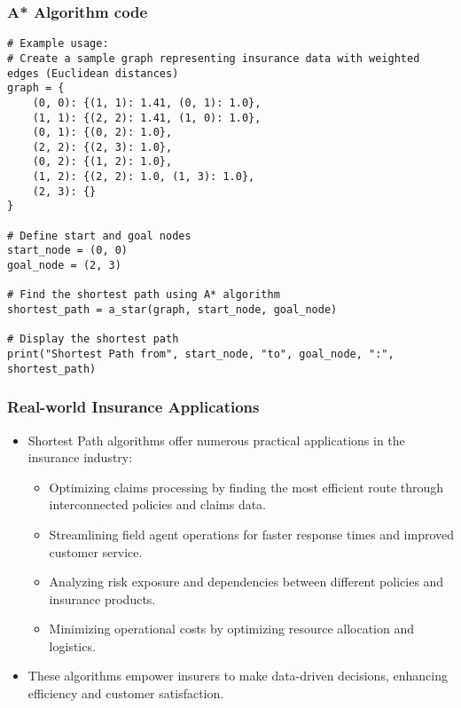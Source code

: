 \begin{frame}[fragile]\frametitle{A* Algorithm code}

\begin{lstlisting}[basicstyle=\tiny]
# Example usage:
# Create a sample graph representing insurance data with weighted edges (Euclidean distances)
graph = {
    (0, 0): {(1, 1): 1.41, (0, 1): 1.0},
    (1, 1): {(2, 2): 1.41, (1, 0): 1.0},
    (0, 1): {(0, 2): 1.0},
    (2, 2): {(2, 3): 1.0},
    (0, 2): {(1, 2): 1.0},
    (1, 2): {(2, 2): 1.0, (1, 3): 1.0},
    (2, 3): {}
}

# Define start and goal nodes
start_node = (0, 0)
goal_node = (2, 3)

# Find the shortest path using A* algorithm
shortest_path = a_star(graph, start_node, goal_node)

# Display the shortest path
print("Shortest Path from", start_node, "to", goal_node, ":", shortest_path)
\end{lstlisting}
\end{frame}


\begin{frame}[fragile]\frametitle{Real-world Insurance Applications}
\begin{itemize}
\item Shortest Path algorithms offer numerous practical applications in the insurance industry:
\begin{itemize}
\item Optimizing claims processing by finding the most efficient route through interconnected policies and claims data.
\item Streamlining field agent operations for faster response times and improved customer service.
\item Analyzing risk exposure and dependencies between different policies and insurance products.
\item Minimizing operational costs by optimizing resource allocation and logistics.
\end{itemize}
\item These algorithms empower insurers to make data-driven decisions, enhancing efficiency and customer satisfaction.
\end{itemize}
\end{frame}


